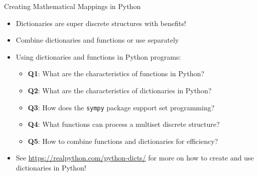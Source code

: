 \documentclass[14pt,aspectratio=169]{beamer}
\begin{document}
%
\begin{frame}{Creating Mathematical Mappings in Python}
  \begin{itemize}
    \item Dictionaries are super discrete structures with benefits!
      \vspace*{-.2in}
    \item Combine dictionaries and functions or use separately
      \vspace*{-.2in}
    \item Using dictionaries and functions in Python programs:
      \begin{itemize}
        \item {\bf Q1}: What are the characteristics of functions in Python?
        \item {\bf Q2}: What are the characteristics of dictionaries in Python?
        \item {\bf Q3}: How does the {\tt sympy} package support set
          programming?
        \item {\bf Q4}: What functions can process a multiset discrete
          structure?
        \item {\bf Q5}: How to combine functions and dictionaries for
          efficiency?
      \end{itemize}
      \vspace*{-.2in}
    \item See \url{https://realpython.com/python-dicts/} for more on how to
      create and use dictionaries in Python!
  \end{itemize}
\end{frame}
\end{document}
